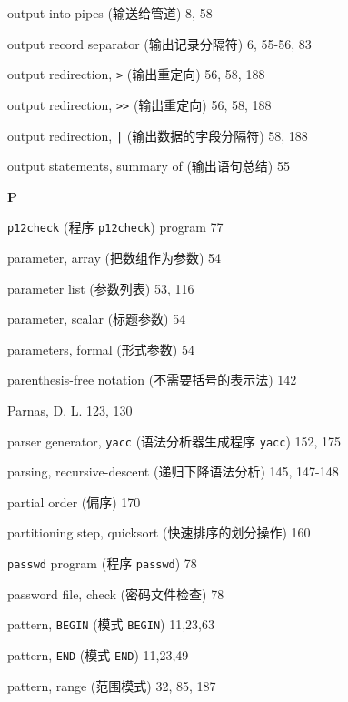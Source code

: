 \begin{multicols}{2}
\hangindent=2pc  output into pipes (输送给管道) 8, 58

\hangindent=2pc  output record separator (输出记录分隔符)
6, 55-56,  83

\hangindent=2pc  output redirection, \verb'>' (输出重定向)
56, 58, 188

\hangindent=2pc  output redirection, \verb'>>' (输出重定向) 56, 58, 188

\hangindent=2pc  output redirection, \verb'|'
(输出数据的字段分隔符) 58, 188

\hangindent=2pc  output statements, summary of (输出语句总结) 55

\medskip\textbf{\large{P}}

\hangindent=2pc  \verb'p12check' (程序 \verb'p12check') program 77

\hangindent=2pc  parameter, array (把数组作为参数) 54

\hangindent=2pc  parameter list (参数列表) 53, 116

\hangindent=2pc  parameter, scalar (标题参数) 54

\hangindent=2pc  parameters, formal (形式参数) 54

\hangindent=2pc  parenthesis-free notation (不需要括号的表示法) 142

\hangindent=2pc  Parnas, D. L. 123, 130

\hangindent=2pc  parser generator, \verb'yacc'
(语法分析器生成程序 \verb'yacc') 152, 175

\hangindent=2pc  parsing, recursive-descent (递归下降语法分析)
145, 147-148

\hangindent=2pc  partial order (偏序) 170

\hangindent=2pc  partitioning step, quicksort
(快速排序的划分操作) 160

\hangindent=2pc  \verb'passwd' program (程序 \verb'passwd') 78

\hangindent=2pc  password file, check (密码文件检查) 78

\hangindent=2pc  pattern, \verb'BEGIN' (模式 \verb'BEGIN') 11,23,63

\hangindent=2pc  pattern, \verb'END' (模式 \verb'END') 11,23,49

\hangindent=2pc  pattern, range (范围模式) 32, 85, 187


\end{multicols}
